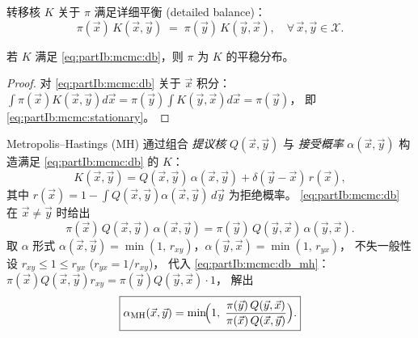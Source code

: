 \begin{definition}[详细平衡]
\label{def:partIb:db}
转移核 $K$ 关于 $\pi$ 满足详细平衡 (detailed balance)：
\begin{equation}
  \pi(\vec x)\,K(\vec x,\vec y)\;=\;\pi(\vec y)\,K(\vec y,\vec x),
  \quad \forall\,\vec x,\vec y\in\mathcal X.
  \label{eq:partIb:mcmc:db}
\end{equation}
\end{definition}

\begin{lemma}
\label{lem:partIb:db_implies_stat}
若 $K$ 满足 \eqref{eq:partIb:mcmc:db}，则 $\pi$ 为 $K$ 的平稳分布。
\end{lemma}

\begin{proof}
对 \eqref{eq:partIb:mcmc:db} 关于 $\vec x$ 积分：
$\int\pi(\vec x)K(\vec x,\vec y)d\vec x = \pi(\vec y)\int K(\vec y,\vec x)d\vec x = \pi(\vec y)$，
即 \eqref{eq:partIb:mcmc:stationary}。\qedhere
\end{proof}

Metropolis--Hastings (MH) 通过组合 \emph{提议核} $Q(\vec x,\vec y)$ 与
\emph{接受概率} $\alpha(\vec x,\vec y)$ 构造满足 \eqref{eq:partIb:mcmc:db} 的 $K$：
\begin{equation}
  K(\vec x,\vec y)
  = Q(\vec x,\vec y)\,\alpha(\vec x,\vec y)
   +\delta(\vec y-\vec x)\,r(\vec x),
  \label{eq:partIb:mcmc:K_mh}
\end{equation}
其中 $r(\vec x)=1-\int Q(\vec x,\vec y)\alpha(\vec x,\vec y)\,d\vec y$ 为拒绝概率。
\eqref{eq:partIb:mcmc:db} 在 $\vec x\neq\vec y$ 时给出
\begin{equation}
  \pi(\vec x)\,Q(\vec x,\vec y)\,\alpha(\vec x,\vec y)
  = \pi(\vec y)\,Q(\vec y,\vec x)\,\alpha(\vec y,\vec x).
  \label{eq:partIb:mcmc:db_mh}
\end{equation}
取 $\alpha$ 形式 $\alpha(\vec x,\vec y)=\min(1,\,r_{xy})$，$\alpha(\vec y,\vec x)=\min(1,\,r_{yx})$，
不失一般性设 $r_{xy}\leq 1\leq r_{yx}$ ($r_{yx}=1/r_{xy}$)，
代入 \eqref{eq:partIb:mcmc:db_mh}：
$\pi(\vec x)Q(\vec x,\vec y)r_{xy}=\pi(\vec y)Q(\vec y,\vec x)\cdot 1$，
解出
\begin{equation}
  \boxed{
  \alpha_{\mathrm{MH}}(\vec x,\vec y)
  = \min\!\Bigl(1,\;
    \frac{\pi(\vec y)\,Q(\vec y,\vec x)}{\pi(\vec x)\,Q(\vec x,\vec y)}\Bigr).
  }
  \label{eq:partIb:mcmc:alpha_mh}
\end{equation}

